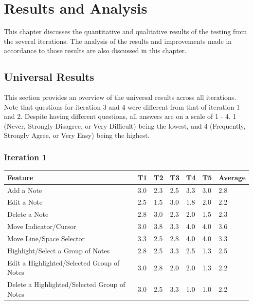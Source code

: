 
\chapter{Results and Analysis}

	This chapter discusses the quantitative and qualitative results of the testing from the several iterations. The analysis of the results and improvements made in accordance to those results are also discussed in this chapter.			

	\section{Universal Results}
		This section provides an overview of the universal results across all iterations. Note that questions for iteration 3 and 4 were different from that of iteration 1 and 2. Despite having different questions, all answers are on a scale of 1 - 4, 1 (Never, Strongly Disagree, or Very Difficult) being the lowest, and 4 (Frequently, Strongly Agree, or Very Easy) being the highest. 

		\subsection{Iteration 1} 

			\begin{table}[!htpb]
			  \centering
			   \label{tab:results-features-it1}
			  \begin{tabular}{|p{5cm}|R{.7cm}|R{.7cm}|R{.7cm}|R{.7cm}|R{.7cm}|R{1.5cm}|}
			  	\hline
			  	\textbf{Feature} & \textbf{T1} & \textbf{T2} & \textbf{T3} & \textbf{T4} & \textbf{T5} & \textbf{Average} \\ \hline
				Add a Note															& 3.0 & 2.3 & 2.5 & 3.3 & 3.0 & 2.8 \\ \hline 
				Edit a Note 															& 2.5 & 1.5 & 3.0 & 1.8 & 2.0 & 2.2 \\ \hline
				Delete a Note 														& 2.8 & 3.0 & 2.3 & 2.0 & 1.5 & 2.3 \\ \hline
				Move Indicator/Cursor 										& 3.0 & 3.8 & 3.3 & 4.0 & 4.0 & 3.6 \\ \hline
				Move Line/Space Selector 									& 3.3 & 2.5 & 2.8 & 4.0 & 4.0 & 3.3 \\ \hline
				Highlight/Select a Group of Notes 						& 2.8 & 2.5 & 3.3 & 2.5 & 1.3 & 2.5 \\ \hline
				Edit a Highlighted/Selected Group of Notes 		& 3.0 & 2.8 & 2.0 & 2.0 & 1.3 & 2.2 \\ \hline
				Delete a Highlighted/Selected Group of Notes 	& 3.0 & 2.5 & 3.3 & 1.0 & 1.0 & 2.2 \\ \hline
			  \end{tabular}
			\end{table}

